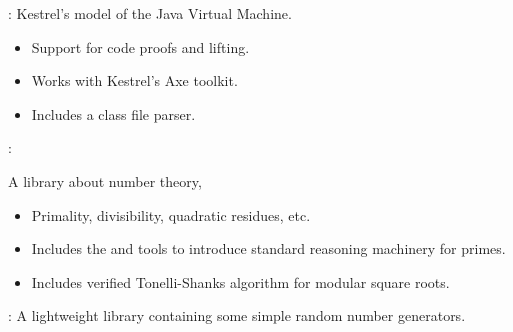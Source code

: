 
\begin{frame}

\newlibtitle

:
Kestrel's model of the Java Virtual Machine.
\begin{itemize}
\item Support for code proofs and lifting.
\item Works with Kestrel's Axe toolkit.
\item Includes a class file parser.
\end{itemize}

\end{frame}


\begin{frame}

\newlibtitle

:

A library about number theory,

\begin{itemize}

\item Primality, divisibility, quadratic residues, etc.

\item Includes the  and  tools to
  introduce standard reasoning machinery for primes.

\item Includes verified Tonelli-Shanks algorithm for modular square roots.

\end{itemize}

\end{frame}


\begin{frame}

\newlibtitle

:
A lightweight library containing some simple random number generators.

\end{frame}



